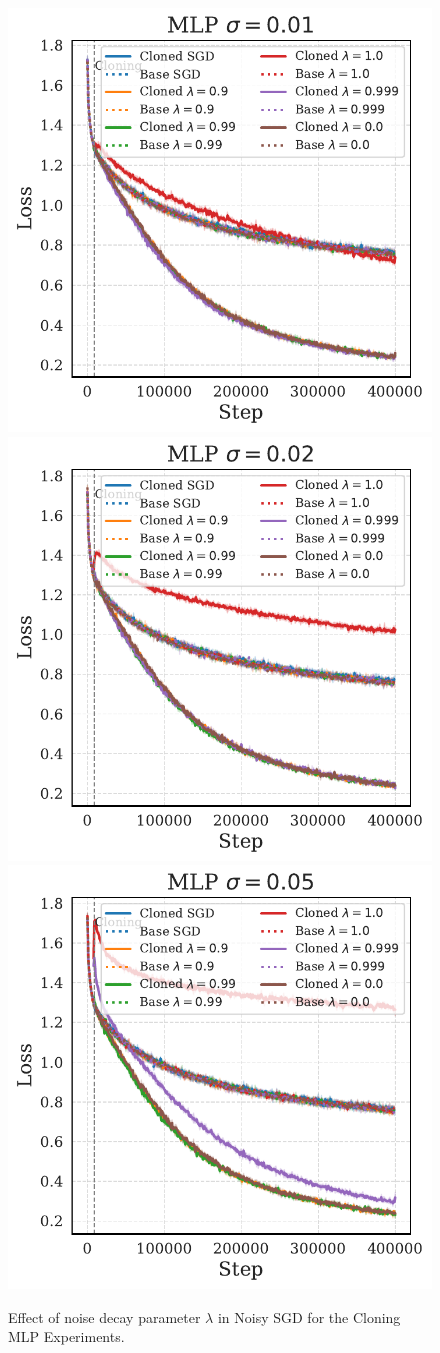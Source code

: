 \documentclass{article}
\numberwithin{figure}{section}
\begin{document}
\begin{figure}
    \centering
    \includegraphics[width=0.3\linewidth]{paper/images/mlp_noises_cloning_losses_plot_lamda_sigma_0.01.pdf}
    \includegraphics[width=0.3\linewidth]{paper/images/mlp_noises_cloning_losses_plot_lamda_sigma_0.02.pdf}
    \includegraphics[width=0.3\linewidth]{paper/images/mlp_noises_cloning_losses_plot_lamda_sigma_0.05.pdf}
    \caption{Effect of noise decay parameter $\lambda$ in Noisy SGD for the Cloning MLP Experiments.}
    \label{fig:cloning-decay-mlp}
\end{figure}
\end{document}
